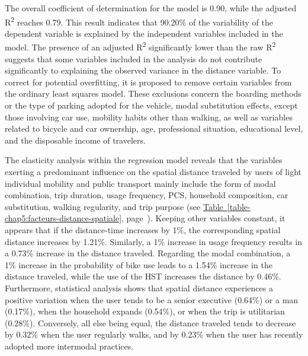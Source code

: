 \begin{refsegment}
The overall coefficient of determination for the model is 0.90, while the adjusted R\textsuperscript{2} reaches 0.79. This result indicates that 90.20\% of the variability of the dependent variable is explained by the independent variables included in the model. The presence of an adjusted R\textsuperscript{2} significantly lower than the raw R\textsuperscript{2} suggests that some variables included in the analysis do not contribute significantly to explaining the observed variance in the distance variable. To correct for potential overfitting, it is proposed to remove certain variables from the ordinary least squares model. These exclusions concern the boarding methods or the type of parking adopted for the vehicle, modal substitution effects, except those involving car use, mobility habits other than walking, as well as variables related to bicycle and car ownership, age, professional situation, educational level, and the disposable income of travelers.%


The elasticity analysis within the regression model reveals that the variables exerting a predominant influence on the spatial distance traveled by users of light individual mobility and public transport mainly include the form of modal combination, trip duration, usage frequency, \acrfull{PCS}, household composition, car substitution, walking regularity, and trip purpose (see \hyperref[table-chap5:facteurs-distance-spatiale]{Table~\ref{table-chap5:facteurs-distance-spatiale}}, page~\pageref{table-chap5:facteurs-distance-spatiale}). Keeping other variables constant, it appears that if the distance-time increases by 1\%, the corresponding spatial distance increases by 1.21\%. Similarly, a 1\% increase in usage frequency results in a 0.73\% increase in the distance traveled. Regarding the modal combination, a 1\% increase in the probability of bike use leads to a 1.54\% increase in the distance traveled, while the use of the \acrshort{HST} increases the distance by 0.46\%. Furthermore, statistical analysis shows that spatial distance experiences a positive variation when the user tends to be a senior executive (0.64\%) or a man (0.17\%), when the household expands (0.54\%), or when the trip is utilitarian (0.28\%). Conversely, all else being equal, the distance traveled tends to decrease by 0.32\% when the user regularly walks, and by 0.23\% when the user has recently adopted more intermodal practices.%


\end{refsegment}
